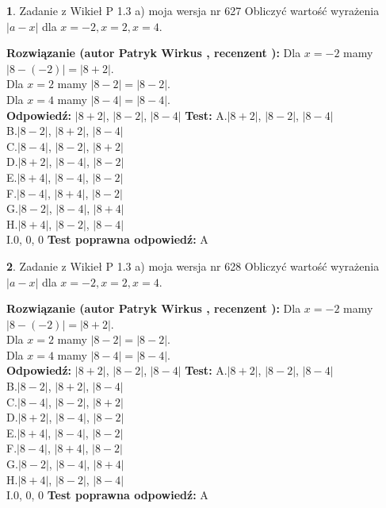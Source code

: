 \documentclass[12pt, a4paper]{article}
\theoremstyle{definition} %
\newtheorem{zad}{}
\newcommand{\zadStart}[1]{\begin{zad}#1\newline}
\newcommand{\zadStop}{\end{zad}}
\newcommand{\rozwStart}[2]{\noindent \textbf{Rozwiązanie (autor #1 , recenzent #2): }\newline}
\newcommand{\rozwStop}{\newline}
\newcommand{\odpStart}{\noindent \textbf{Odpowiedź:}\newline}
\newcommand{\odpStop}{\newline}
\newcommand{\testStart}{\noindent \textbf{Test:}\newline}
\newcommand{\testStop}{\newline}
\newcommand{\kluczStart}{\noindent \textbf{Test poprawna odpowiedź:}\newline}
\newcommand{\kluczStop}{\newline}
\begin{document}
\zadStart{Zadanie z Wikieł P 1.3 a) moja wersja nr 627}
Obliczyć wartość wyrażenia $|a - x|$ dla $x=-2,x=2,x=4$.
\zadStop
\rozwStart{Patryk Wirkus}{}
Dla $x = -2$ mamy $|8 - (-2)| = |8 + 2|$.\\
Dla $x = 2$ mamy $|8 - 2| = |8 - 2|$.\\
Dla $x = 4$ mamy $|8 - 4| = |8 - 4|$.\\
\rozwStop
\odpStart
$|8 + 2|$, $|8 - 2|$, $|8 - 4|$
\odpStop
\testStart
A.$|8 + 2|$, $|8 - 2|$, $|8 - 4|$\\
B.$|8 - 2|$, $|8 + 2|$, $|8 - 4|$\\
C.$|8 - 4|$, $|8 - 2|$, $|8 + 2|$\\
D.$|8 + 2|$, $|8 - 4|$, $|8 - 2|$\\
E.$|8 + 4|$, $|8 - 4|$, $|8 - 2|$\\
F.$|8 - 4|$, $|8 + 4|$, $|8 - 2|$\\
G.$|8 - 2|$, $|8 - 4|$, $|8 + 4|$\\
H.$|8 + 4|$, $|8 - 2|$, $|8 - 4|$\\
I.$0$, $0$, $0$
\testStop
\kluczStart
A
\kluczStop



\zadStart{Zadanie z Wikieł P 1.3 a) moja wersja nr 628}
Obliczyć wartość wyrażenia $|a - x|$ dla $x=-2,x=2,x=4$.
\zadStop
\rozwStart{Patryk Wirkus}{}
Dla $x = -2$ mamy $|8 - (-2)| = |8 + 2|$.\\
Dla $x = 2$ mamy $|8 - 2| = |8 - 2|$.\\
Dla $x = 4$ mamy $|8 - 4| = |8 - 4|$.\\
\rozwStop
\odpStart
$|8 + 2|$, $|8 - 2|$, $|8 - 4|$
\odpStop
\testStart
A.$|8 + 2|$, $|8 - 2|$, $|8 - 4|$\\
B.$|8 - 2|$, $|8 + 2|$, $|8 - 4|$\\
C.$|8 - 4|$, $|8 - 2|$, $|8 + 2|$\\
D.$|8 + 2|$, $|8 - 4|$, $|8 - 2|$\\
E.$|8 + 4|$, $|8 - 4|$, $|8 - 2|$\\
F.$|8 - 4|$, $|8 + 4|$, $|8 - 2|$\\
G.$|8 - 2|$, $|8 - 4|$, $|8 + 4|$\\
H.$|8 + 4|$, $|8 - 2|$, $|8 - 4|$\\
I.$0$, $0$, $0$
\testStop
\kluczStart
A
\kluczStop
\end{document}
